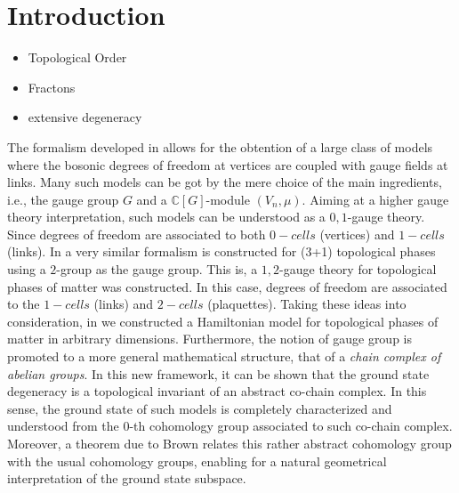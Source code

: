 \documentclass[%
nofootinbib,
 amsmath,amssymb,
aps,
]{revtex4-1}
\theoremstyle{plain}%
\theoremstyle{definition}
\theoremstyle{remark}
\begin{document}
\section{\label{sec:intro}Introduction}
\begin{itemize}
\item Topological Order
\item Fractons
\item extensive degeneracy
\end{itemize}
The formalism developed in \cite{pramod} allows for the obtention of a large class of models where the bosonic degrees of freedom at vertices are coupled with gauge fields at links. Many such models can be got by the mere choice of the main ingredients, i.e., the gauge group $G$ and a $\mathbb{C}[G]$-module $(V_n, \mu)$. Aiming at a higher gauge theory interpretation, such models can be understood as a $0,1$-gauge theory. Since degrees of freedom are associated to both $0-cells$ (vertices) and $1-cells$ (links). In \cite{kazuothesis,ricardo} a very similar formalism is constructed for (3+1) topological phases using a $2$-group as the gauge group. This is, a $1,2$-gauge theory for topological phases of matter was constructed. In this case, degrees of freedom are associated to the $1-cells$ (links) and $2-cells$ (plaquettes). Taking these ideas into consideration, in \cite{higher} we constructed a Hamiltonian model for topological phases of matter in arbitrary dimensions. Furthermore, the notion of gauge group is promoted to a more general mathematical structure, that of a \textit{chain complex of abelian groups}. In this new framework, it can be shown \cite{higher} that the ground state degeneracy is a topological invariant of an abstract co-chain complex. In this sense, the ground state of such models is completely characterized and understood from the $0$-th cohomology group associated to such co-chain complex. Moreover, a theorem due to Brown \cite{Brown} relates this rather abstract cohomology group with the usual cohomology groups, enabling for a natural geometrical interpretation of the ground state subspace. 
\end{document}
